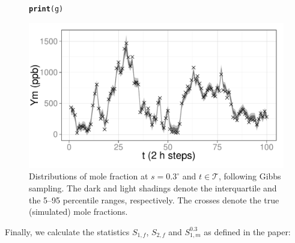 \documentclass[a4paper,11pt]{article}\usepackage[]{graphicx}\usepackage[]{color}
\makeatletter
\def\maxwidth{ %
  \ifdim\Gin@nat@width>\linewidth
    \linewidth
  \else
    \Gin@nat@width
  \fi
}
\newcommand{\hlstd}[1]{\textcolor[rgb]{0.345,0.345,0.345}{#1}}%
\newcommand{\hlkwd}[1]{\textcolor[rgb]{0.737,0.353,0.396}{\textbf{#1}}}%
\newenvironment{kframe}{%
 \def\at@end@of@kframe{}%
 \ifinner\ifhmode%
  \def\at@end@of@kframe{\end{minipage}}%
  \begin{minipage}{\columnwidth}%
 \fi\fi%
 \def\FrameCommand##1{\hskip\@totalleftmargin \hskip-\fboxsep
 \colorbox{shadecolor}{##1}\hskip-\fboxsep
     \hskip-\linewidth \hskip-\@totalleftmargin \hskip\columnwidth}%
 \MakeFramed {\advance\hsize-\width
   \@totalleftmargin\z@ \linewidth\hsize
   \@setminipage}}%
 {\par\unskip\endMakeFramed%
 \at@end@of@kframe}
\newenvironment{knitrout}{}{} %
\makeatother
\begin{document}
\begin{figure}[!ht]
\begin{center}
\begin{knitrout}
\color{fgcolor}\begin{kframe}
\begin{alltt}
\hlkwd{print}\hlstd{(g)}
\end{alltt}
\end{kframe}
\includegraphics[width=\maxwidth]{figure/unnamed-chunk-8-1} 

\end{knitrout}
\caption{Distributions of mole fraction at $s = 0.3^\circ$ and $t \in \mathcal{T}$, following Gibbs sampling. The dark and light shadings denote the interquartile and the 5--95 percentile ranges, respectively. The crosses denote the true (simulated) mole fractions.} \label{fig:MF}
\end{center}
\end{figure}

Finally, we calculate the statistics $S_{1,f}$, $S_{2,f}$ and $S_{1,m}^{0.3}$ as defined in the paper:
\end{document}

